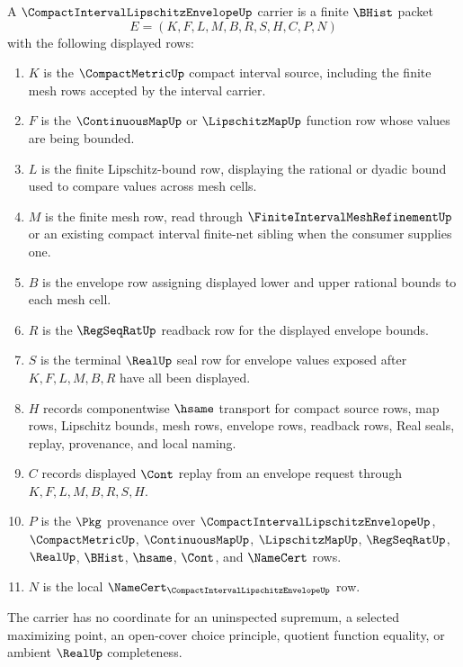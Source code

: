 \begin{definition}
\label{def:compact-interval-lipschitz-envelope-packet}
A $\CompactIntervalLipschitzEnvelopeUp$ carrier is a finite $\BHist$ packet
$$
E=(K,F,L,M,B,R,S,H,C,P,N)
$$
with the following displayed rows:
\begin{enumerate}
\item $K$ is the $\CompactMetricUp$ compact interval source, including the finite mesh rows accepted by the interval carrier.
\item $F$ is the $\ContinuousMapUp$ or $\LipschitzMapUp$ function row whose values are being bounded.
\item $L$ is the finite Lipschitz-bound row, displaying the rational or dyadic bound used to compare values across mesh cells.
\item $M$ is the finite mesh row, read through $\FiniteIntervalMeshRefinementUp$ or an existing compact interval finite-net sibling when the consumer supplies one.
\item $B$ is the envelope row assigning displayed lower and upper rational bounds to each mesh cell.
\item $R$ is the $\RegSeqRatUp$ readback row for the displayed envelope bounds.
\item $S$ is the terminal $\RealUp$ seal row for envelope values exposed after $K,F,L,M,B,R$ have all been displayed.
\item $H$ records componentwise $\hsame$ transport for compact source rows, map rows, Lipschitz bounds, mesh rows, envelope rows, readback rows, Real seals, replay, provenance, and local naming.
\item $C$ records displayed $\Cont$ replay from an envelope request through $K,F,L,M,B,R,S,H$.
\item $P$ is the $\Pkg$ provenance over $\CompactIntervalLipschitzEnvelopeUp$, $\CompactMetricUp$, $\ContinuousMapUp$, $\LipschitzMapUp$, $\RegSeqRatUp$, $\RealUp$, $\BHist$, $\hsame$, $\Cont$, and $\NameCert$ rows.
\item $N$ is the local $\NameCert_{\CompactIntervalLipschitzEnvelopeUp}$ row.
\end{enumerate}
The carrier has no coordinate for an uninspected supremum, a selected maximizing point, an open-cover choice principle, quotient function equality, or ambient $\RealUp$ completeness.
\end{definition}


